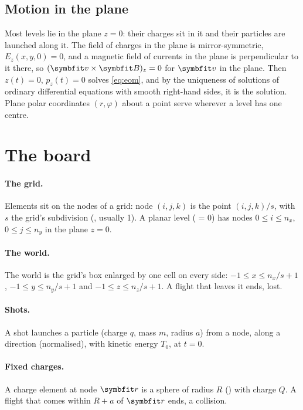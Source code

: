\documentclass{leveldoc}
\begin{document}
\subsection{Motion in the plane}\label{sec:plane}

Most levels lie in the plane $z = 0$: their charges sit in it and their particles are launched
along it. The field of charges in the plane is mirror-symmetric, $E_z(x, y, 0) = 0$, and a
magnetic field of currents in the plane is perpendicular to it there, so
$(\vect{v}\times\vect{B})_z = 0$ for $\vect{v}$ in the plane. Then $z(t) = 0$, $p_z(t) = 0$
solves \eqref{eq:eom}, and by the uniqueness of solutions of ordinary differential equations
with smooth right-hand sides, it is the solution. Plane polar coordinates $(r,\varphi)$ about
a point serve wherever a level has one centre.

\section{The board}\label{sec:board}

\paragraph{The grid.} Elements sit on the nodes of a grid: node $(i,j,k)$ is the point
$(i,j,k)/s$, with $s$ the grid's subdivision (, usually 1). A planar
level ( = 0) has nodes $0\le i\le n_x$, $0\le j\le n_y$ in the plane $z = 0$.

\paragraph{The world.} The world is the grid's box enlarged by one cell on every side:
$-1\le x\le n_x/s+1$, $-1\le y\le n_y/s+1$ and $-1\le z\le n_z/s+1$. A flight that leaves it
ends, lost.

\paragraph{Shots.} A shot launches a particle (charge $q$, mass $m$, radius $a$) from a node,
along a direction (normalised), with kinetic energy $T_0$, at $t = 0$.

\paragraph{Fixed charges.} A charge element at node $\vect{r}$ is a sphere of radius $R$
() with charge $Q$. A flight that comes within $R + a$ of
$\vect{r}$ ends, a collision.
\end{document}
